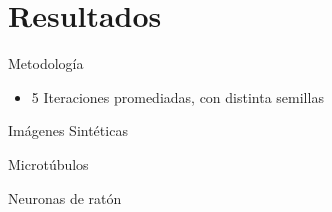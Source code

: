 \section{Resultados}
\begin{frame}{Metodolog\'ia}
\begin{itemize}
    \item 5 Iteraciones promediadas, con distinta semillas
\end{itemize}
    
\end{frame}
\begin{frame}{Im\'agenes Sint\'eticas}
    
\end{frame}
\begin{frame}{Microt\'ubulos}
    
\end{frame}

\begin{frame}{Neuronas de rat\'on}

\end{frame}